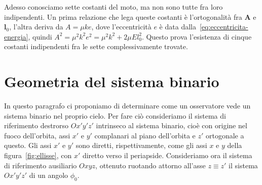 {Adesso conosciamo sette costanti del moto, ma non sono tutte fra loro
indipendenti. Un prima relazione che lega queste costanti è l'ortogonalità fra
$\bm{A}$ e $\bm{l}_0$, l'altra deriva da $A = \mu ke$, dove l'eccentricità $e$ è
data dalla~\eqref{eq:eccentricita-energia}, quindi $A^2 = \mu^2k^2e^2 = \mu^2k^2
+ 2\mu El_0^2$. Questo prova l'esistenza di cinque costanti indipendenti fra le
sette complessivamente trovate.

\section{Geometria del sistema binario}
\label{sec:geometria-sistema}

In questo paragrafo ci proponiamo di determinare come un osservatore vede un
sistema binario nel proprio cielo. Per fare ciò consideriamo il sistema di
riferimento destrorso $Ox'y'z'$ intrinseco al sistema binario, cioè con origine
nel fuoco dell'orbita, assi $x'$ e $y'$ complanari al piano dell'orbita e $z'$
ortogonale a questo. Gli assi $x'$ e $y'$ sono diretti, rispettivamente, come
gli assi $x$ e $y$ della figura~\ref{fig:ellisse}, con $x'$ diretto verso il
periapside. Consideriamo ora il sistema di riferimento ausiliario $Oxyz$,
ottenuto ruotando attorno all'asse $z\equiv z'$ il sistema $Ox'y'z'$ di un
angolo $\phi_0$.

}
